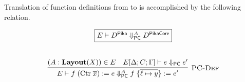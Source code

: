 Translation of function definitions from \Pika{} to \PikaCore{} is accomplished by the following relation.

\[
  \begin{array}{c}
    \fbox{$E \vdash D^{\Pika} \defStep^{A} D^{\PikaCore}$}
    \fboxNewlines
    \labinfer[PC-Def]{E \vdash f\; (\textrm{Ctr}\; \overline{x}) := e \defStep^{A} f\; \{ \overline{\ell \mapsto y} \} := e' }
      {(A : \Layout{X}) \in E
      &E[\Delta;C;\Gamma] \vdash e \pcStep e'
      }
  \end{array}
\]

%
%
%
%
%
